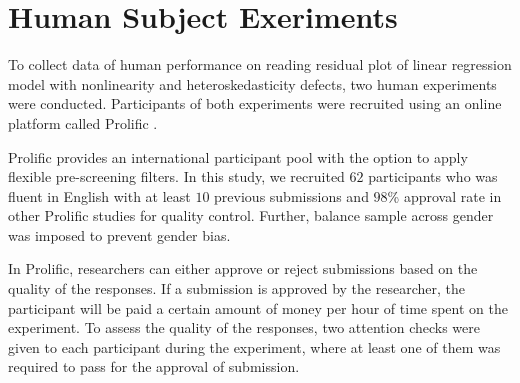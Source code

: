 \documentclass{monashthesis}
\theoremstyle{definition}
\theoremstyle{definition}
\theoremstyle{definition}
\theoremstyle{definition}
\theoremstyle{remark}
\begin{document}
\hypertarget{human-subject-exeriments}{%
\chapter{Human Subject Exeriments}\label{human-subject-exeriments}}

To collect data of human performance on reading residual plot of linear regression model with nonlinearity and heteroskedasticity defects, two human experiments were conducted. Participants of both experiments were recruited using an online platform called Prolific \autocite{prolific_prolific_2022}.

Prolific provides an international participant pool with the option to apply flexible pre-screening filters. In this study, we recruited \(62\) participants who was fluent in English with at least \(10\) previous submissions and \(98\)\% approval rate in other Prolific studies for quality control. Further, balance sample across gender was imposed to prevent gender bias.

In Prolific, researchers can either approve or reject submissions based on the quality of the responses. If a submission is approved by the researcher, the participant will be paid a certain amount of money per hour of time spent on the experiment. To assess the quality of the responses, two attention checks were given to each participant during the experiment, where at least one of them was required to pass for the approval of submission.
\end{document}
